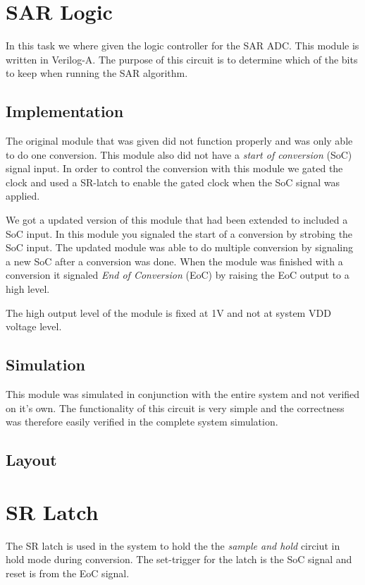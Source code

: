 \documentclass[english, 12pt, a4paper]{ifimaster}
\begin{document}
\section{SAR Logic}
In this task we where given the logic controller for the SAR ADC. This module is written in Verilog-A. 
The purpose of this circuit is to determine which of the bits to keep when running the SAR algorithm.

\subsection{Implementation}
The original module that was given did not function properly and was only able to do one conversion. This module also did not have a \textit{start of conversion} (SoC) signal input.
In order to control the conversion with this module we gated the clock and used a SR-latch to enable the gated clock when the SoC signal was applied.

We got a updated version of this module that had been extended to included a SoC input. In this module you signaled the start of a conversion by strobing the SoC input.
The updated module was able to do multiple conversion by signaling a new SoC after a conversion was done. 
When the module was finished with a conversion it signaled \textit{End of Conversion} (EoC) by raising the EoC output to a high level. 

The high output level of the module is fixed at 1V and not at system VDD voltage level.
\subsection{Simulation}
This module was simulated in conjunction with the entire system and not verified on it's own. 
The functionality of this circuit is very simple and the correctness was therefore easily verified in the complete system simulation.

\subsection{Layout}

\section{SR Latch}
The SR latch is used in the system to hold the the \textit{sample and hold} circiut in hold mode during conversion. 
The set-trigger for the latch is the SoC signal and reset is from the EoC signal. 
\end{document}
